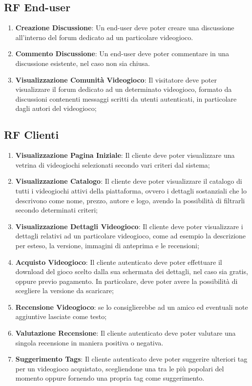 \subsection{RF End-user}
\begin{enumerate}
	\item \textbf{Creazione Discussione}: Un end-user deve poter creare una discussione all’interno del forum dedicato ad un particolare videogioco.
	\item \textbf{Commento Discussione}: Un end-user deve poter commentare in una discussione esistente, nel caso non sia chiusa.
	\item \textbf{Visualizzazione Comunità Videogioco}: Il visitatore deve poter visualizzare il forum dedicato ad un determinato videogioco, formato da discussioni contenenti messaggi scritti da utenti autenticati, in particolare dagli autori del videogioco;
\end{enumerate}

\subsection{RF Clienti}
\begin{enumerate}
	\item \textbf{Visualizzazione Pagina Iniziale}: Il cliente deve poter visualizzare una vetrina di videogiochi selezionati secondo vari criteri dal sistema;
	\item \textbf{Visualizzazione Catalogo}: Il cliente deve poter visualizzare il catalogo di tutti i videogiochi attivi della piattaforma, ovvero i dettagli sostanziali che lo descrivono come nome, prezzo, autore e logo, avendo la possibilità di filtrarli secondo determinati criteri;
	\item \textbf{Visualizzazione Dettagli Videogioco}: Il cliente deve poter visualizzare i dettagli relativi ad un particolare videogioco, come ad esempio la descrizione per esteso, la versione, immagini di anteprima e le recensioni;
	\item \textbf{Acquisto Videogioco}: Il cliente autenticato deve poter effettuare il download del gioco scelto dalla sua schermata dei dettagli, nel caso sia gratis, oppure previo pagamento. In particolare, deve poter avere la possibilità di scegliere la versione da scaricare;
	\item \textbf{Recensione Videogioco}: se lo consiglierebbe ad un amico ed eventuali note aggiuntive lasciate come testo;
	\item \textbf{Valutazione Recensione}: Il cliente autenticato deve poter valutare una singola recensione in maniera positiva o negativa.
	\item \textbf{Suggerimento Tags}: Il cliente autenticato deve poter suggerire ulteriori tag per un videogioco acquistato, scegliendone una tra le più popolari del momento oppure fornendo una propria tag come suggerimento.	
\end{enumerate}

